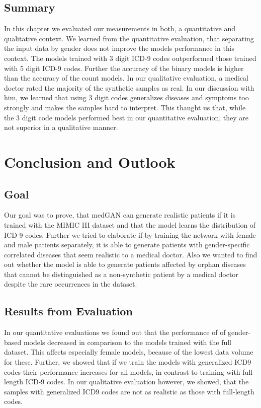 \documentclass[11pt, a4paper, oneside]{book}
\begin{document}
\section{Summary}
In this chapter we evaluated our measurements in both, a quantitative and qualitative context. We learned from the quantitative evaluation, that separating the input data by gender does not improve the models performance in this context. The models trained with 3 digit ICD-9 codes outperformed those trained with 5 digit ICD-9 codes. Further the accuracy of the binary models is higher than the accuracy of the count models.
In our qualitative evaluation, a medical doctor rated the majority of the synthetic samples as real. In our discussion with him, we learned that using 3 digit codes generalizes diseases and symptoms too strongly and makes the samples hard to interpret.
This thaught us that, while the 3 digit code models performed best in our quantitative evaluation, they are not superior in a qualitative manner.

\chapter{Conclusion and Outlook}
\section{Goal}
Our goal was to prove, that medGAN can generate realistic patients if it is trained with the MIMIC III dataset and that the model learns the distribution of ICD-9 codes. Further we tried to elaborate if by training the network with female and male patients separately, it is able to generate patients with gender-specific correlated diseases that seem realistic to a medical doctor. Also we wanted to find out whether the model is able to generate patients affected by orphan diseases that cannot be distinguished as a non-synthetic patient by a medical doctor despite the rare occurrences in the dataset.
\section{Results from Evaluation}
In our quantitative evaluations we found out that the performance of of gender-based models decreased in comparison to the models trained with the full dataset. This affects especially female models, because of the lowest data volume for these. Further, we showed  that if we train the models with generalized ICD9 codes their performance increases for all models, in contrast to training with full-length ICD-9 codes.
In our qualitative evaluation however, we showed, that the samples with generalized ICD9 codes are not as realistic as those with full-length codes.
\end{document}

